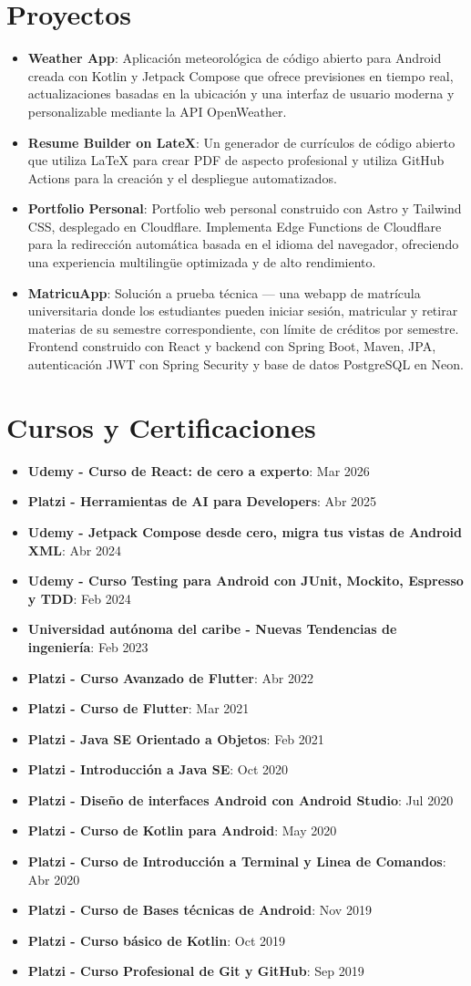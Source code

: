 \documentclass[letterpaper,11pt]{article}
\newcommand{\resumeItem}[2]{
  \item\small{
    \textbf{#1}{: #2 \vspace{-2pt}}
  }
}
\newcommand{\resumeSubItem}[2]{\resumeItem{#1}{#2}\vspace{-4pt}}
\newcommand{\resumeSubHeadingListStart}{\begin{itemize}[leftmargin=*]}
\newcommand{\resumeSubHeadingListEnd}{\end{itemize}}
\begin{document}
\section{Proyectos}
\resumeSubHeadingListStart
\resumeSubItem{Weather App}
{Aplicación meteorológica de código abierto para Android creada con Kotlin y Jetpack Compose que ofrece previsiones en tiempo real, actualizaciones basadas en la ubicación y una interfaz de usuario moderna y personalizable mediante la API OpenWeather.}
\resumeSubItem{Resume Builder on LateX}
{Un generador de currículos de código abierto que utiliza LaTeX para crear PDF de aspecto profesional y utiliza GitHub Actions para la creación y el despliegue automatizados.}
\resumeSubItem{Portfolio Personal}
{Portfolio web personal construido con Astro y Tailwind CSS, desplegado en Cloudflare. Implementa Edge Functions de Cloudflare para la redirección automática basada en el idioma del navegador, ofreciendo una experiencia multilingüe optimizada y de alto rendimiento.}
\resumeSubItem{MatricuApp}
{Solución a prueba técnica — una webapp de matrícula universitaria donde los estudiantes pueden iniciar sesión, matricular y retirar materias de su semestre correspondiente, con límite de créditos por semestre. Frontend construido con React y backend con Spring Boot, Maven, JPA, autenticación JWT con Spring Security y base de datos PostgreSQL en Neon.}
\resumeSubHeadingListEnd

\section{Cursos y Certificaciones}
\resumeSubHeadingListStart
\resumeSubItem{Udemy - Curso de React: de cero a experto}{Mar 2026}
\resumeSubItem{Platzi - Herramientas de AI para Developers}{Abr 2025}
\resumeSubItem{Udemy - Jetpack Compose desde cero, migra tus vistas de Android XML}{Abr 2024}
\resumeSubItem{Udemy - Curso Testing para Android con JUnit, Mockito, Espresso y TDD}{Feb 2024}
\resumeSubItem{Universidad autónoma del caribe - Nuevas Tendencias de ingeniería}{Feb 2023}
\resumeSubItem{Platzi - Curso Avanzado de Flutter}{Abr 2022}
\resumeSubItem{Platzi - Curso de Flutter}{Mar 2021}
\resumeSubItem{Platzi - Java SE Orientado a Objetos}{Feb 2021}
\resumeSubItem{Platzi - Introducción a Java SE}{Oct 2020}
\resumeSubItem{Platzi - Diseño de interfaces Android con Android Studio}{Jul 2020}
\resumeSubItem{Platzi - Curso de Kotlin para Android}{May 2020}
\resumeSubItem{Platzi - Curso de Introducción a Terminal y Linea de Comandos}{Abr 2020}
\resumeSubItem{Platzi - Curso de Bases técnicas de Android}{Nov 2019}
\resumeSubItem{Platzi - Curso básico de Kotlin}{Oct 2019}
\resumeSubItem{Platzi - Curso Profesional de Git y GitHub}{Sep 2019}
\resumeSubHeadingListEnd
\end{document}
